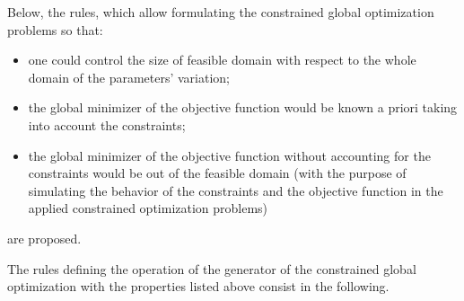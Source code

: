 \documentclass{aip-cp}
\begin{document}
Below, the rules, which allow formulating the constrained global optimization problems so that:
\begin{itemize}
	\item one could control the size of feasible domain with respect to the whole domain of the parameters' variation;
	\item the global minimizer of the objective function would be known a priori taking into account the constraints;
	\item the global minimizer of the objective function without accounting for the constraints would be out of the feasible domain (with the purpose of simulating the behavior of the constraints and the objective function in the applied constrained optimization problems)
\end{itemize}
are proposed. 

The rules defining the operation of the generator of the constrained global optimization with the properties listed above consist in the following.
\end{document}
